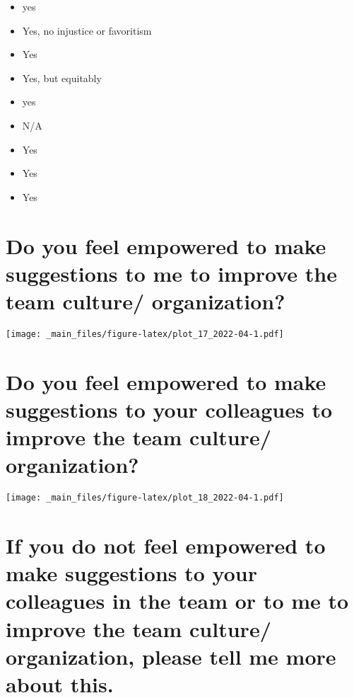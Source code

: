 \documentclass[
]{book}
\providecommand{\tightlist}{%
  \setlength{\itemsep}{0pt}\setlength{\parskip}{0pt}}
\begin{document}
\begin{itemize}
\tightlist
\item
  yes
\item
  Yes, no injustice or favoritism
\item
  Yes
\item
  Yes, but equitably
\item
  yes
\item
  N/A
\item
  Yes
\item
  Yes
\item
  Yes
\end{itemize}

\hypertarget{do-you-feel-empowered-to-make-suggestions-to-me-to-improve-the-team-culture-organization}{%
\section{Do you feel empowered to make suggestions to me to improve the team culture/ organization?}\label{do-you-feel-empowered-to-make-suggestions-to-me-to-improve-the-team-culture-organization}}

\texttt{[image: \_main\_files/figure-latex/plot\_17\_2022-04-1.pdf]}

\hypertarget{do-you-feel-empowered-to-make-suggestions-to-your-colleagues-to-improve-the-team-culture-organization}{%
\section{Do you feel empowered to make suggestions to your colleagues to improve the team culture/ organization?}\label{do-you-feel-empowered-to-make-suggestions-to-your-colleagues-to-improve-the-team-culture-organization}}

\texttt{[image: \_main\_files/figure-latex/plot\_18\_2022-04-1.pdf]}

\hypertarget{if-you-do-not-feel-empowered-to-make-suggestions-to-your-colleagues-in-the-team-or-to-me-to-improve-the-team-culture-organization-please-tell-me-more-about-this.}{%
\section{If you do not feel empowered to make suggestions to your colleagues in the team or to me to improve the team culture/ organization, please tell me more about this.}\label{if-you-do-not-feel-empowered-to-make-suggestions-to-your-colleagues-in-the-team-or-to-me-to-improve-the-team-culture-organization-please-tell-me-more-about-this.}}
\end{document}
